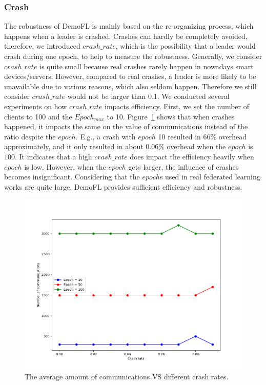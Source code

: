 \subsubsection{Crash}
The robustness of DemoFL is mainly based on the re-organizing process, which happens when a leader is crashed. Crashes can hardly be completely avoided, therefore, we introduced $crash\_rate$, which is the possibility that a leader would crash during one epoch, to help to measure the robustness. Generally, we consider $crash\_rate$ is quite small because real crashes rarely happen in nowadays smart devices/servers. However, compared to real crashes, a leader is more likely to be unavailable due to various reasons, which also seldom happen. Therefore we still consider $crash\_rate$ would not be larger than $0.1$. We conducted several experiments on how $crash\_rate$ impacts efficiency. First, we set the number of clients to 100 and the $Epoch_{max}$ to 10. Figure~\ref{comm-crash} shows that when crashes happened, it impacts the same on the value of communications instead of the ratio despite the $epoch$. E.g., a crash with $epoch$ 10 resulted in $66\%$ overhead approximately, and it only resulted in about $0.06\%$ overhead when the $epoch$ is $100$. It indicates that a high $crash\_rate$ does impact the efficiency heavily when $epoch$ is low. However, when the $epoch$ gets larger, the influence of crashes becomes insignificant. Considering that the $epoch$s used in real federated learning works are quite large, DemoFL provides sufficient efficiency and robustness.

\begin{figure}[!ht]
    \centering
    \includegraphics[width=\columnwidth]{img/comm-crash.png}
    \caption{The average amount of communications VS different crash rates.}
    \label{comm-crash}
\end{figure}

